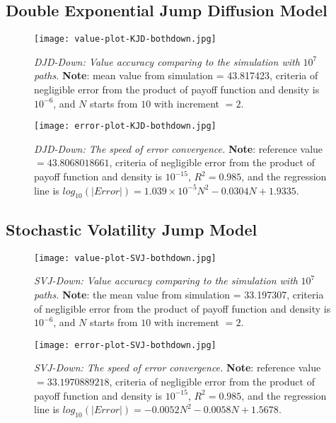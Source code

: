 \subsection{Double Exponential Jump Diffusion Model}
\begin{figure}[H]
    \centering
    \texttt{[image: value-plot-KJD-bothdown.jpg]}
    \caption[\emph{DJD-Down: Value accuracy comparing to the simulation with} $10^7$ \emph{paths.}]{\emph{DJD-Down: Value accuracy comparing to the simulation with} $10^7$ \emph{paths.} \textbf{Note}: mean value from simulation = 43.817423, criteria of negligible error from the product of payoff function and density is $10^{-6}$, and $N$ starts from $10$  with increment $=2$.}

    \label{fig:label}
\end{figure}
\begin{figure}[H]
    \centering
    \texttt{[image: error-plot-KJD-bothdown.jpg]}
    \caption[\emph{DJD-Down: The speed of error convergence.}]{\emph{DJD-Down: The speed of error convergence.} \textbf{Note}: reference value $=43.8068018661$, criteria of negligible error from the product of payoff function and density is $10^{-15}$, $R^2=0.985$, and the regression line is $log_{10}\left(|Error|\right) = 1.039\times 10^{-5}N^2-0.0304N+1.9335$.}

    \label{fig:label}
\end{figure}



\subsection{Stochastic Volatility Jump Model}
\begin{figure}[H]
    \centering
    \texttt{[image: value-plot-SVJ-bothdown.jpg]}
    \caption[\emph{SVJ-Down: Value accuracy comparing to the simulation with} $10^7$ \emph{paths.}]{\emph{SVJ-Down: Value accuracy comparing to the simulation with} $10^7$ \emph{paths.} \textbf{Note}: the mean value from simulation = 33.197307, criteria of negligible error from the product of payoff function and density is $10^{-6}$, and $N$ starts from $10$  with increment $=2$.}

    \label{fig:label}
\end{figure}

\begin{figure}[H]
    \centering
    \texttt{[image: error-plot-SVJ-bothdown.jpg]}
    \caption[\emph{SVJ-Down: The speed of error convergence.}]{\emph{SVJ-Down: The speed of error convergence.} \textbf{Note}: reference value $=33.1970889218$, criteria of negligible error from the product of payoff function and density is $10^{-15}$, $R^2=0.985$, and the regression line is $log_{10}\left(|Error|\right) = -0.0052N^2-0.0058N+1.5678$.}

    \label{fig:label}
\end{figure}



